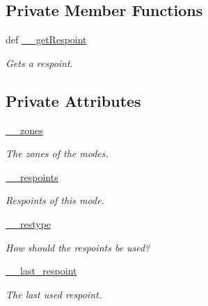 \subsection*{Private Member Functions}
\begin{DoxyCompactItemize}
\item 
def \hyperlink{class_mode_1_1_mode_af6ee8ed30365011c35b48d4c5696e05b}{\_\-\_\-getRespoint}
\begin{DoxyCompactList}\small\item\em Gets a respoint. \item\end{DoxyCompactList}\end{DoxyCompactItemize}
\subsection*{Private Attributes}
\begin{DoxyCompactItemize}
\item 
\hyperlink{class_mode_1_1_mode_a0672655c12a3e18e65d084c395d9378c}{\_\-\_\-zones}
\begin{DoxyCompactList}\small\item\em The zones of the modes. \item\end{DoxyCompactList}\item 
\hyperlink{class_mode_1_1_mode_a2e07ed5d08d3ced387d24587f8a87967}{\_\-\_\-respoints}
\begin{DoxyCompactList}\small\item\em Respoints of this mode. \item\end{DoxyCompactList}\item 
\hyperlink{class_mode_1_1_mode_a1fd32aea9872573e444d08b65ec28ef2}{\_\-\_\-restype}
\begin{DoxyCompactList}\small\item\em How should the respoints be used? \item\end{DoxyCompactList}\item 
\hyperlink{class_mode_1_1_mode_a93dd6d85da76655a5ca8f5a4873109f9}{\_\-\_\-last\_\-respoint}
\begin{DoxyCompactList}\small\item\em The last used respoint. \item\end{DoxyCompactList}\end{DoxyCompactItemize}
